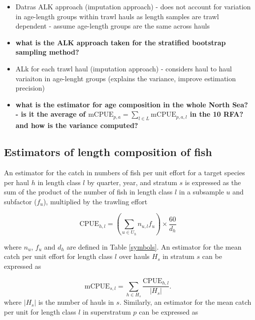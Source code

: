 \documentclass[a4paper 12pt]{article}
\numberwithin{equation}{section}
\begin{document}
\begin{itemize}
\item Datras ALK approach (imputation approach) - does not account for variation in age-length groups within trawl hauls as length samples are trawl dependent - assume age-length groups are the same across hauls  
\item {\bf what is the ALK approach taken for the stratified bootstrap sampling method?}
\item ALk for each trawl haul (imputation approach) - considers haul to haul variaiton in age-lenght groups (explains the variance, improve estimation precision)

\item {\bf what is the estimator for age composition in the whole North Sea? - is it the average of $\mathrm{mCPUE}_{p,a} =  \sum\limits_{l \in L} \mathrm{mCPUE}_{p,a,l}$ in the 10 RFA? and how is the variance computed?}
\end{itemize}


\subsection{Estimators of length composition of fish}
\label{estimatorsoflength}
An estimator for the catch in numbers of fish per unit effort for a target species   per haul $h$ in length class $l$ by quarter, year, and stratum $s$ is expressed as the sum of the product of the number of fish in length class $l$ in a subsample $u$ and subfactor ($f_{u}$), multiplied by the trawling effort

\begin{equation}
\mathrm{CPUE}_{h,l} = \displaystyle \left(\sum\limits_{u \in U_{h}} n_{u,l}f_{u} \right) \times \frac{60}{d_{h}}
\label{cpuelength}
\end{equation}

\noindent where $n_{u} $, $f_{u}$ and $d_{h}$ are defined in Table \ref{symbols}. An estimator for the mean catch per unit effort for length class $l$ over hauls $H_{s}$ in stratum $s$  can be expressed as 

\begin{equation}
\mathrm{mCPUE}_{s,l} = \displaystyle\sum\limits_{h \in H_{s}} \frac{\mathrm{CPUE}_{h,l}}{|H_{s}|}.
\label{mcpuelength}
\end{equation}
\noindent where $|H_{s}|$ is the number of hauls in $s$. Similarly, an estimator for the mean catch per unit for length class $l$ in superstratum $p$ can be expressed as
\end{document}
